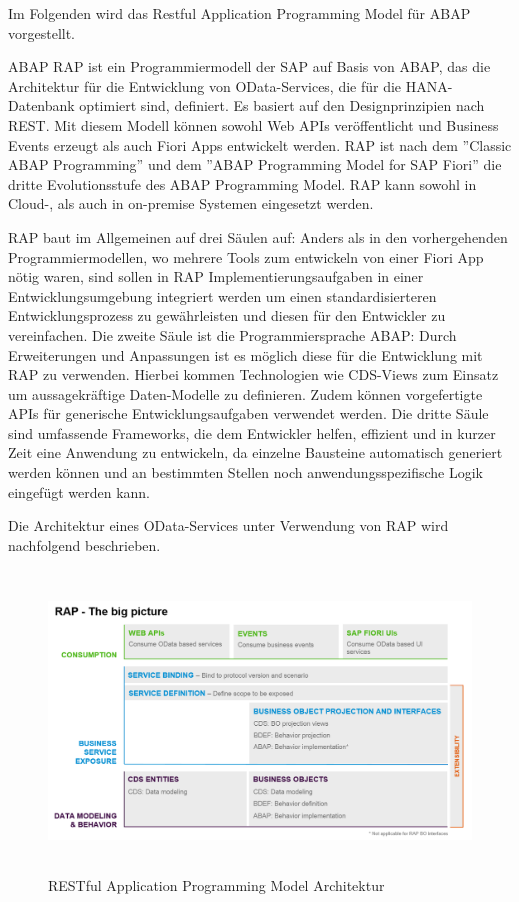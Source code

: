 Im Folgenden wird das Restful Application Programming Model für ABAP vorgestellt.

ABAP RAP ist ein Programmiermodell der SAP auf Basis von ABAP, das die Architektur für die Entwicklung von OData-Services, die für die HANA-Datenbank optimiert sind, definiert. Es basiert auf den Designprinzipien nach REST. Mit diesem Modell können sowohl Web APIs veröffentlicht und Business Events erzeugt als auch Fiori Apps entwickelt werden. RAP ist nach dem ''Classic ABAP Programming'' und dem ''ABAP Programming Model for SAP Fiori'' die dritte Evolutionsstufe des ABAP Programming Model.  RAP kann sowohl in Cloud-, als auch in on-premise Systemen eingesetzt werden.

RAP baut im Allgemeinen auf drei Säulen auf: Anders als in den vorhergehenden Programmiermodellen, wo mehrere Tools zum entwickeln von \zB einer Fiori App nötig waren, sind sollen in RAP Implementierungsaufgaben in einer Entwicklungsumgebung integriert werden um einen standardisierteren Entwicklungsprozess zu gewährleisten und diesen für den Entwickler zu vereinfachen. Die zweite Säule ist die Programmiersprache ABAP: Durch Erweiterungen und Anpassungen ist es möglich diese für die Entwicklung mit RAP zu verwenden. Hierbei kommen Technologien wie CDS-Views zum Einsatz um aussagekräftige Daten-Modelle zu definieren. Zudem können vorgefertigte APIs für generische Entwicklungsaufgaben verwendet werden. Die dritte Säule sind umfassende Frameworks, die dem Entwickler helfen, effizient und in kurzer Zeit eine Anwendung zu entwickeln, da einzelne Bausteine automatisch generiert werden können und an bestimmten Stellen noch anwendungsspezifische Logik eingefügt werden kann.

Die Architektur eines OData-Services unter Verwendung von RAP wird nachfolgend beschrieben.

\begin{figure}[h]
    \centering
    \includegraphics[height=8cm]{Bilder/RAP_Architektur.png}
    \caption[RESTful Application Programming Model Architektur]{RESTful Application Programming Model Architektur}
    \label{fig:iso_norm}
\end{figure}


